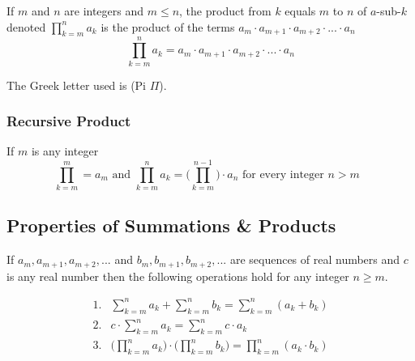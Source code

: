 \documentclass[11pt]{article}
\begin{document}
\begin{definition}[Product]\label{def:product}
    If $m$ and $n$ are integers and $m \leq n$,
    the product from $k$ equals $m$ to $n$ of $a$-sub-$k$ denoted
    $\prod_{k=m}^n a_k$
    is the product of the terms $a_m \cdot a_{m+1} \cdot a_{m+2} \cdot ... \cdot a_n$
    \begin{equation*}
        \prod_{k=m}^n a_k = a_m \cdot a_{m+1} \cdot a_{m+2} \cdot ... \cdot a_n
    \end{equation*}

    The Greek letter used is (Pi $\Pi$).
\end{definition}

\subsubsection{Recursive Product}

\begin{definition}\label{def:recursive-product}
    If $m$ is any integer
    \begin{equation*}
        \prod_{k=m}^m = a_m \text{ and } \prod_{k=m}^n a_k = \Biggl( \prod_{k=m}^{n-1} \Biggl) \cdot a_n \text { for every integer $n > m$ }
    \end{equation*}
\end{definition}

\subsection{Properties of Summations \& Products}

\begin{definition}\label{def:props-sums-prods}
    If $a_m, a_{m+1}, a_{m+2}, ...$ and $b_m, b_{m+1}, b_{m+2}, ...$
    are sequences of real numbers and $c$ is any real number then
    the following operations hold for any integer $n \geq m$.

    \begin{align*}
        \text{1.} & \sum_{k=m}^n a_k + \sum_{k=m}^n b_k = \sum_{k=m}^n (a_k + b_k) \\
        \text{2.} & c \cdot \sum_{k=m}^n a_k = \sum_{k=m}^n c \cdot a_k \\
        \text{3.} & \Biggl( \prod_{k=m}^n a_k \Biggl) \cdot \Biggl( \prod_{k=m}^n b_k \Biggl) =
                    \prod_{k=m}^n (a_k \cdot b_k) \\
    \end{align*}

\end{definition}
\end{document}
